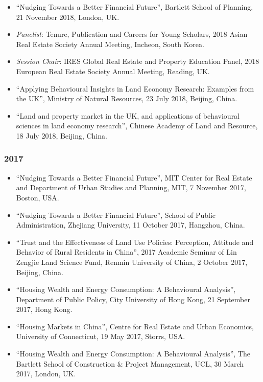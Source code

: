 \documentclass[11pt,a4paper]{article}
\providecommand{\tightlist}{%
  \setlength{\itemsep}{1pt}\setlength{\parskip}{0pt}}
\begin{document}
\begin{itemize}
\tightlist
\item
  ``Nudging Towards a Better Financial Future'', Bartlett School of
  Planning, 21 November 2018, London, UK.
\item
  \emph{Panelist}: Tenure, Publication and Careers for Young Scholars,
  2018 Asian Real Estate Society Annual Meeting, Incheon, South Korea.
\item
  \emph{Session Chair}: IRES Global Real Estate and Property Education
  Panel, 2018 European Real Estate Society Annual Meeting, Reading, UK.
\item
  ``Applying Behavioural Insights in Land Economy Research: Examples
  from the UK'', Ministry of Natural Resources, 23 July 2018, Beijing,
  China.
\item
  ``Land and property market in the UK, and applications of behavioural
  sciences in land economy research'', Chinese Academy of Land and
  Resource, 18 July 2018, Beijing, China.
\end{itemize}

\subsubsection{2017}\label{section-28}

\begin{itemize}
\tightlist
\item
  ``Nudging Towards a Better Financial Future'', MIT Center for Real
  Estate and Department of Urban Studies and Planning, MIT, 7 November
  2017, Boston, USA.
\item
  ``Nudging Towards a Better Financial Future'', School of Public
  Administration, Zhejiang University, 11 October 2017, Hangzhou, China.
\item
  ``Trust and the Effectiveness of Land Use Policies: Perception,
  Attitude and Behavior of Rural Residents in China'', 2017 Academic
  Seminar of Lin Zengjie Land Science Fund, Renmin University of China,
  2 October 2017, Beijing, China.
\item
  ``Housing Wealth and Energy Consumption: A Behavioural Analysis'',
  Department of Public Policy, City University of Hong Kong, 21
  September 2017, Hong Kong.
\item
  ``Housing Markets in China'', Centre for Real Estate and Urban
  Economics, University of Connecticut, 19 May 2017, Storrs, USA.
\item
  ``Housing Wealth and Energy Consumption: A Behavioural Analysis'', The
  Bartlett School of Construction \& Project Management, UCL, 30 March
  2017, London, UK.
\end{itemize}
\end{document}
